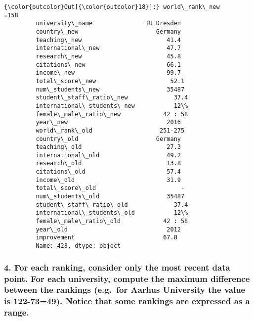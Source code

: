\documentclass[11pt]{article}
\begin{document}
\begin{Verbatim}[commandchars=\\\{\}]
{\color{outcolor}Out[{\color{outcolor}18}]:} world\_rank\_new                      =158
         university\_name               TU Dresden
         country\_new                      Germany
         teaching\_new                        41.4
         international\_new                   47.7
         research\_new                        45.8
         citations\_new                       66.1
         income\_new                          99.7
         total\_score\_new                     52.1
         num\_students\_new                   35487
         student\_staff\_ratio\_new             37.4
         international\_students\_new           12\%
         female\_male\_ratio\_new            42 : 58
         year\_new                            2016
         world\_rank\_old                   251-275
         country\_old                      Germany
         teaching\_old                        27.3
         international\_old                   49.2
         research\_old                        13.8
         citations\_old                       57.4
         income\_old                          31.9
         total\_score\_old                        -
         num\_students\_old                   35487
         student\_staff\_ratio\_old             37.4
         international\_students\_old           12\%
         female\_male\_ratio\_old            42 : 58
         year\_old                            2012
         improvement                         67.8
         Name: 428, dtype: object
\end{Verbatim}
            
    \hypertarget{for-each-ranking-consider-only-the-most-recent-data-point.-for-each-university-compute-the-maximum-difference-between-the-rankings-e.g.for-aarhus-university-the-value-is-122-7349.-notice-that-some-rankings-are-expressed-as-a-range.}{%
\subsubsection{4. For each ranking, consider only the most recent data
point. For each university, compute the maximum difference between the
rankings (e.g.~for Aarhus University the value is 122-73=49). Notice
that some rankings are expressed as a
range.}\label{for-each-ranking-consider-only-the-most-recent-data-point.-for-each-university-compute-the-maximum-difference-between-the-rankings-e.g.for-aarhus-university-the-value-is-122-7349.-notice-that-some-rankings-are-expressed-as-a-range.}}
\end{document}
